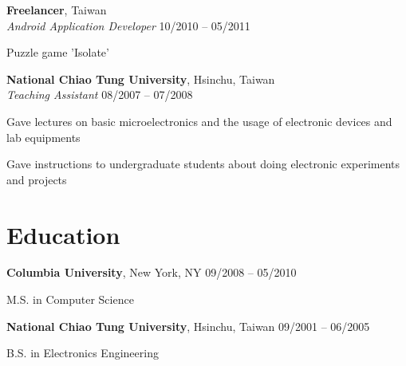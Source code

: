 \documentclass[margin,line]{resume}
\begin{document}
\begin{resume}
    \textbf{Freelancer}, Taiwan \\
    \textsl{Android Application Developer} \hfill 10/2010 -- 05/2011 \vspace{-3mm}\\\vspace{-1mm}%
      \begin{list2}
      \item Puzzle game 'Isolate'
      \end{list2}

    \textbf{National Chiao Tung University}, Hsinchu, Taiwan \\
    \textsl{Teaching Assistant} \hfill 08/2007 -- 07/2008 \vspace{-3mm}\\\vspace{-1mm}%
      \begin{list2}
      \item Gave lectures on basic microelectronics and the usage of electronic devices and lab equipments
      \item Gave instructions to undergraduate students about doing electronic experiments and projects
      \end{list2}

    \section{\mysidestyle Education}

    \textbf{Columbia University}, New York, NY \hfill 09/2008 -- 05/2010 \vspace{-3mm}\\\vspace{-1mm}%
      \begin{list2}
       \item M.S. in Computer Science
      \end{list2}
 
    \textbf{National Chiao Tung University}, Hsinchu, Taiwan \hfill 09/2001 -- 06/2005 \vspace{-3mm}\\\vspace{-1mm}%
      \begin{list2}
       \item B.S. in Electronics Engineering
      \end{list2}


\end{resume}
\end{document}

